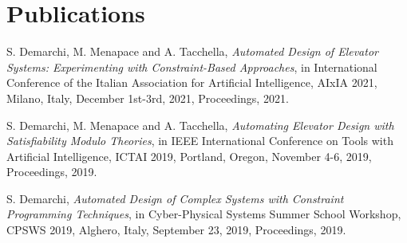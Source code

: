 \section{\sc Publications}

S. Demarchi, M. Menapace and A. Tacchella, \textit{Automated Design of Elevator Systems: Experimenting with Constraint-Based Approaches}, in International Conference of the Italian Association for Artificial Intelligence, AIxIA 2021, Milano, Italy, December 1st-3rd, 2021, Proceedings, 2021.

S. Demarchi, M. Menapace and A. Tacchella, \textit{Automating Elevator 
	Design with Satisfiability Modulo Theories}, in IEEE International 
Conference on Tools with Artificial Intelligence, ICTAI 2019, Portland, 
Oregon, November 4-6, 2019, Proceedings, 2019.

S. Demarchi, \textit{Automated Design of Complex Systems with Constraint 
	Programming Techniques}, in Cyber-Physical Systems Summer School 
Workshop, CPSWS 2019, Alghero, Italy, September 23, 2019, Proceedings, 
2019.